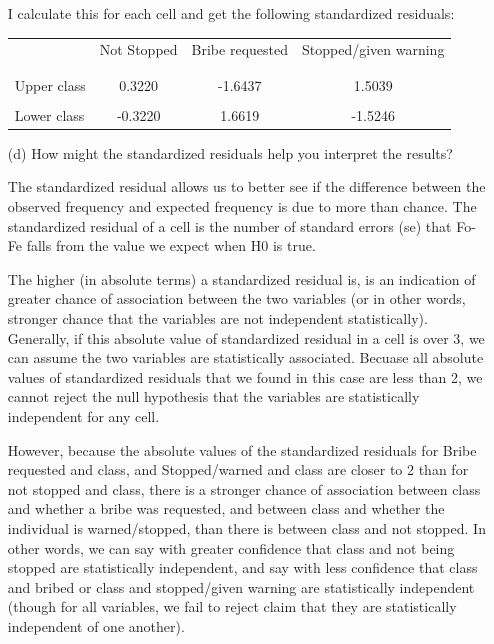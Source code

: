\documentclass[12pt,letterpaper]{article}
\begin{document}
\begin{enumerate}
	I calculate this for each cell and get the following standardized residuals:
	
	\begin{table}[h]
		\centering
		\begin{tabular}{l | c c c }
			& Not Stopped & Bribe requested & Stopped/given warning \\
			\\[-1.8ex] 
			\hline \\[-1.8ex]
			Upper class  & 0.3220 & -1.6437 & 1.5039 \\
			\\
			Lower class & -0.3220 & 1.6619  &  -1.5246 \\
			
		\end{tabular}
	\end{table}
	
	
	\vspace{2cm}
	\item [(d)] How might the standardized residuals help you interpret the results?  
	
	The standardized residual allows us to better see if the difference between the observed frequency and expected frequency is due to more than chance. The standardized residual of a cell is the number of standard errors (se) that Fo-Fe falls from the value we expect when H0 is true. 
	 
	 The higher (in absolute terms) a standardized residual is, is an indication of greater chance of association between the two variables (or in other words, stronger chance that the variables are not independent statistically).  Generally, if this absolute value of standardized residual in a cell is over 3, we can assume the two variables are statistically associated.  Becuase all absolute values of standardized residuals that we found in this case are less than 2, we cannot reject the null hypothesis that the variables are statistically independent for any cell.
	 
	 However, because the absolute values of the standardized residuals for Bribe requested and class, and Stopped/warned and class are closer to 2 than for not stopped and class, there is a stronger chance of association between class and whether a bribe was requested, and between class and whether the individual is warned/stopped, than there is between class and not stopped. In other words, we can say with greater confidence that class and not being stopped are statistically independent, and say with less confidence that class and bribed or class and stopped/given warning are statistically independent (though for all variables, we fail to reject claim that they are statistically independent of one another).  
	
\end{enumerate}
\newpage
\end{document}
